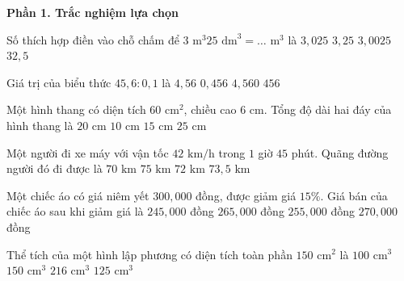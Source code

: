 \textbf{Phần 1. Trắc nghiệm lựa chọn}

\begin{ex} %
Số thích hợp điền vào chỗ chấm để $3\text{ m}^3 25\text{ dm}^3 = \dots\text{ m}^3$ là
\choice
{\True $3{,}025$}
{$3{,}25$}
{$3{,}0025$}
{$32{,}5$}
\end{ex}

\begin{ex} %
Giá trị của biểu thức $45{,}6 : 0{,}1$ là
\choice
{$4{,}56$}
{$0{,}456$}
{$4,560$}
{\True $456$}
\end{ex}

\begin{ex} %
Một hình thang có diện tích $60\text{ cm}^2$, chiều cao $6\text{ cm}$. Tổng độ dài hai đáy của hình thang là
\choice
{\True $20\text{ cm}$}
{$10\text{ cm}$}
{$15\text{ cm}$}
{$25\text{ cm}$}
\end{ex}

\begin{ex} %
Một người đi xe máy với vận tốc $42\text{ km/h}$ trong $1$ giờ $45$ phút. Quãng đường người đó đi được là
\choice
{$70\text{ km}$}
{$75\text{ km}$}
{$72\text{ km}$}
{\True $73{,}5\text{ km}$}
\end{ex}

\begin{ex} %
Một chiếc áo có giá niêm yết $300,000$ đồng, được giảm giá $15\%$. Giá bán của chiếc áo sau khi giảm giá là
\choice
{$245,000$ đồng}
{$265,000$ đồng}
{\True $255,000$ đồng}
{$270,000$ đồng}
\end{ex}

\begin{ex} %
Thể tích của một hình lập phương có diện tích toàn phần $150\text{ cm}^2$ là
\choice
{$100\text{ cm}^3$}
{$150\text{ cm}^3$}
{$216\text{ cm}^3$}
{\True $125\text{ cm}^3$}
\end{ex}

